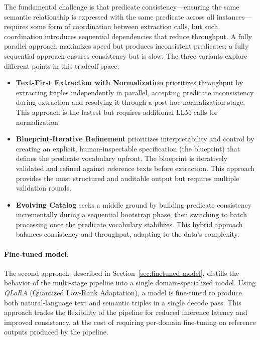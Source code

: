 The fundamental challenge is that predicate consistency---ensuring the same semantic relationship is expressed with the same predicate across all instances---requires some form of coordination between extraction calls, but such coordination introduces sequential dependencies that reduce throughput. A fully parallel approach maximizes speed but produces inconsistent predicates; a fully sequential approach ensures consistency but is slow. The three variants explore different points in this tradeoff space:

\begin{itemize}
  \item \textbf{Text-First Extraction with Normalization} prioritizes throughput by extracting triples independently in parallel, accepting predicate inconsistency during extraction and resolving it through a post-hoc normalization stage. This approach is the fastest but requires additional LLM calls for normalization.
  
  \item \textbf{Blueprint-Iterative Refinement} prioritizes interpretability and control by creating an explicit, human-inspectable specification (the blueprint) that defines the predicate vocabulary upfront. The blueprint is iteratively validated and refined against reference texts before extraction. This approach provides the most structured and auditable output but requires multiple validation rounds.
  
  \item \textbf{Evolving Catalog} seeks a middle ground by building predicate consistency incrementally during a sequential bootstrap phase, then switching to batch processing once the predicate vocabulary stabilizes. This hybrid approach balances consistency and throughput, adapting to the data's complexity.
\end{itemize}

\paragraph{Fine-tuned model.}
The second approach, described in Section~\ref{sec:finetuned-model}, distills the behavior of the multi-stage pipeline into a single domain-specialized model. Using \emph{QLoRA} (Quantized Low-Rank Adaptation), a model is fine-tuned to produce both natural-language text and semantic triples in a single decode pass. This approach trades the flexibility of the pipeline for reduced inference latency and improved consistency, at the cost of requiring per-domain fine-tuning on reference outputs produced by the pipeline.

